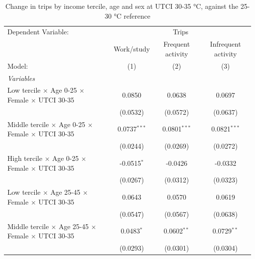 
\begin{table}[htbp]
   \caption{\label{table_intersectionality_30-35} Change in trips by income tercile, age and sex at UTCI 30-35 °C, against the 25-30 °C reference}
   \centering
   \scriptsize
   \renewcommand*{\arraystretch}{0.75}
   \begin{tabular}{lccc}
      \tabularnewline \midrule \midrule
      Dependent Variable: & \multicolumn{3}{c}{Trips}\\
                                                                                & Work/study      & Frequent activity & Infrequent activity \\   
      Model:                                                                    & (1)             & (2)               & (3)\\  
      \midrule
      \emph{Variables}\\
      Low tercile $\times$ Age 0-25 $\times$ Female $\times$ UTCI 30-35         & 0.0850          & 0.0638            & 0.0697\\   
                                                                                & (0.0532)        & (0.0572)          & (0.0637)\\   
      Middle tercile $\times$ Age 0-25 $\times$ Female $\times$ UTCI 30-35      & 0.0737$^{***}$  & 0.0801$^{***}$    & 0.0821$^{***}$\\   
                                                                                & (0.0244)        & (0.0269)          & (0.0272)\\   
      High tercile $\times$ Age 0-25 $\times$ Female $\times$ UTCI 30-35        & -0.0515$^{*}$   & -0.0426           & -0.0332\\   
                                                                                & (0.0267)        & (0.0312)          & (0.0323)\\   
      Low tercile $\times$ Age 25-45 $\times$ Female $\times$ UTCI 30-35        & 0.0643          & 0.0570            & 0.0619\\   
                                                                                & (0.0547)        & (0.0567)          & (0.0638)\\   
      Middle tercile $\times$ Age 25-45 $\times$ Female $\times$ UTCI 30-35     & 0.0483$^{*}$    & 0.0602$^{**}$     & 0.0729$^{**}$\\   
                                                                                & (0.0293)        & (0.0301)          & (0.0304)\\   

\end{tabular}
\end{table}
